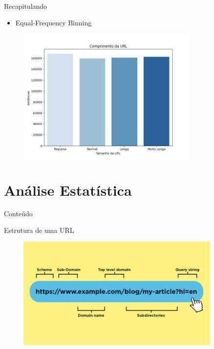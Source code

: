 \documentclass{beamer}
\begin{document}
\begin{frame}{Recapitulando}
    
    \begin{itemize}
        \item Equal-Frequency Binning
    \end{itemize}

    \begin{figure}[H]
        \centering
        \includegraphics[width=0.8\textwidth]{pic/Figure_3.png}
        \label{fig:exampleFig3}
    \end{figure}
    
\end{frame}

\section{Análise Estatística}

\begin{frame}{Conteúdo} 
     \tableofcontents[currentsection]
\end{frame}

\begin{frame}{Estrutura de uma URL}

    \begin{figure}[H]
        \centering
        \includegraphics[width=0.9\textwidth]{pic/Diagram-of-a-URL.jpg}
        \label{fig:exampleFig4}
    \end{figure}
    
\end{frame}
\end{document}
